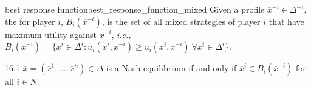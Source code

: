 \documentclass[12pt,letterpaper]{report}
\begin{document}
\begin{defn}{best response function}{best_response_function_mixed}
  Given a profile $\overline{x}^{-i} \in \Delta^{-i}$, the  for player
  $i$, $B_i(\overline{x}^{-i})$, is the set of all mixed strategies of player $i$ that have maximum
  utility against $\overline{x}^{-i}$, \emph{i.e.,}
  $B_i(\overline{x}^{-i}) = \{ \overline{x}^i \in \Delta^i : u_i(\overline{x}^i, \overline{x}^{-i})
    \geq u_i(x^i, \overline{x}^{-i}) \ \forall x^i \in \Delta^i \}$.
\end{defn}

\begin{prop}{}{16.1}
  $\overline{x} = (\overline{x}^1, \ldots, \overline{x}^n) \in \Delta$ is a Nash equilibrium if and
  only if $\overline{x}^i \in B_i(\overline{x}^{-i})$ for all $i \in N$.
\end{prop}
\end{document}
